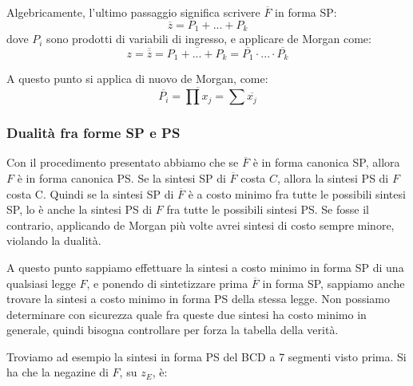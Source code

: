 \documentclass[a4paper,11pt]{article}
\begin{document}
Algebricamente, l'ultimo passaggio significa scrivere $\overline{F}$ in forma SP:
$$
\overline{z} = P_1 + ... + P_k
$$
dove $P_i$ sono prodotti di variabili di ingresso, e applicare de Morgan come:
$$
z = \overline{\overline{z}} = \overline{P_1 + ... + P_k} = \overline{P_1} \cdot ... \cdot \overline{P_k}
$$

A questo punto si applica di nuovo de Morgan, come:
$$
\overline{P_i} = \overline{\prod x_j} = \sum \overline{x_j}
$$

\subsubsection{Dualità fra forme SP e PS}
Con il procedimento presentato abbiamo che se $\overline{F}$ è in forma canonica SP, allora $F$ è in forma canonica PS.
Se la sintesi SP di $\overline{F}$ costa $C$, allora la sintesi PS di $F$ costa C.
Quindi se la sintesi SP di $\overline{F}$ è a costo minimo fra tutte le possibili sintesi SP, lo è anche la sintesi PS di $F$ fra tutte le possibili sintesi PS.
Se fosse il contrario, applicando de Morgan più volte avrei sintesi di costo sempre minore, violando la dualità.

A questo punto sappiamo effettuare la sintesi a costo minimo in forma SP di una qualsiasi legge $F$, e ponendo di sintetizzare prima $\overline{F}$ in forma SP, sappiamo anche trovare la sintesi a costo minimo in forma PS della stessa legge.
Non possiamo determinare con sicurezza quale fra queste due sintesi ha costo minimo in generale, quindi bisogna controllare per forza la tabella della verità.

Troviamo ad esempio la sintesi in forma PS del BCD a 7 segmenti visto prima.
Si ha che la negazine di $F$, su $z_E$, è:
\end{document}
